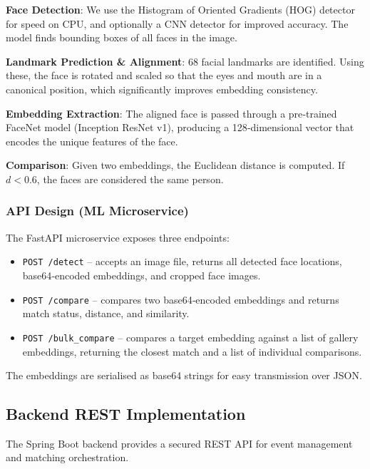 \documentclass[12pt,a4paper]{article}
\begin{document}
\textbf{Face Detection}: We use the Histogram of Oriented Gradients (HOG) detector for speed on CPU, and optionally a CNN detector for improved accuracy. The model finds bounding boxes of all faces in the image.

\textbf{Landmark Prediction \& Alignment}: 68 facial landmarks are identified. Using these, the face is rotated and scaled so that the eyes and mouth are in a canonical position, which significantly improves embedding consistency.

\textbf{Embedding Extraction}: The aligned face is passed through a pre‑trained FaceNet model (Inception ResNet v1), producing a 128‑dimensional vector that encodes the unique features of the face.

\textbf{Comparison}: Given two embeddings, the Euclidean distance is computed. If $d < 0.6$, the faces are considered the same person.

\subsubsection{API Design (ML Microservice)}
The FastAPI microservice exposes three endpoints:
\begin{itemize}
    \item \texttt{POST /detect} – accepts an image file, returns all detected face locations, base64‑encoded embeddings, and cropped face images.
    \item \texttt{POST /compare} – compares two base64‑encoded embeddings and returns match status, distance, and similarity.
    \item \texttt{POST /bulk\_compare} – compares a target embedding against a list of gallery embeddings, returning the closest match and a list of individual comparisons.
\end{itemize}
The embeddings are serialised as base64 strings for easy transmission over JSON.

\subsection{Backend REST Implementation}
The Spring Boot backend provides a secured REST API for event management and matching orchestration.
\end{document}

